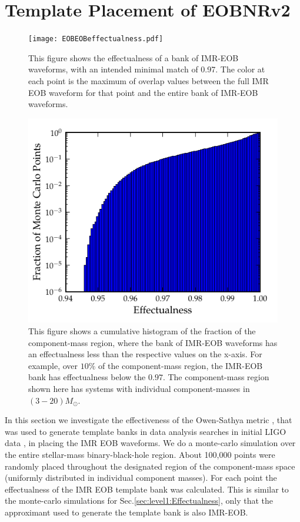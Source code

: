 \documentclass[aps,
prd,
amsmath,
amssymb,
twocolumn,
floatfix,
groupedaddress]{revtex4-1}
\begin{document}
\section{Template Placement of EOBNRv2}\label{sec:level1:templateplacement}
\begin{figure}
\centering
\texttt{[image: EOBEOBeffectualness.pdf]}
\caption{\label{fig:match_eobeob_all}This figure shows the effectualness of a bank of IMR-EOB waveforms, with an intended minimal match of 0.97. The color at each point is the maximum of overlap values between the full IMR EOB waveform for that point and the entire bank of IMR-EOB waveforms.}
\end{figure}
\begin{figure}
\centering
\includegraphics[scale=0.04, clip=false, totalheight=0.3\textheight, width=\columnwidth]{EOBEOBhist.pdf}
\caption{\label{fig:cumhist_eobeob_all}This figure shows a cumulative histogram of the fraction of the component-mass region, where the bank of IMR-EOB waveforms has an effectualness less than the respective values on the x-axis. For example, over $10\%$ of the component-mass region, the IMR-EOB bank has effectualness below the $0.97$. The component-mass region shown here has systems with individual component-masses in $(3-20)M_{\odot}$.}
\end{figure}

In this section we investigate the effectiveness of the Owen-Sathya metric \citep{SathyaMetric2PN}, that was used to generate template banks in data analysis searches in initial LIGO data \citep{LSCSearch2004,LSCSearch2005,LSCSearch2008}, in placing the IMR EOB waveforms. We do a monte-carlo simulation over the entire stellar-mass binary-black-hole region. About 100,000 points were randomly placed throughout the designated region of the component-mass space (uniformly distributed in individual component masses). For each point the effectualness of the IMR EOB template bank was calculated. This is similar to the monte-carlo simulations for Sec.\ref{sec:level1:Effectualness}, only that the approximant used to generate the template bank is also IMR-EOB.
\end{document}
